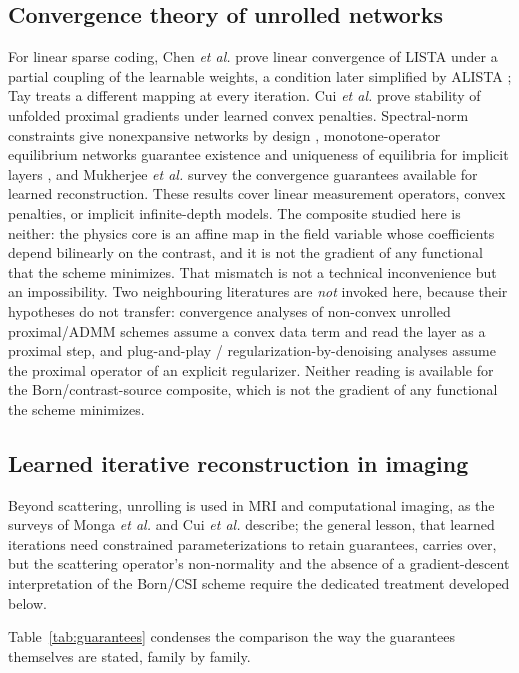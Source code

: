 \documentclass[journal,cmes,article,submit,moreauthors,pdftex]{Definitions/tsp}
\begin{document}
\subsection{Convergence theory of unrolled networks}
For linear sparse coding, Chen \emph{et al.} \cite{listacp} prove linear convergence of LISTA
\cite{lista} under a partial coupling of the learnable weights, a condition later simplified by
ALISTA \cite{alista}; Tay \cite{algomapping} treats a different mapping at every iteration. Cui
\emph{et al.} \cite{cui_reg} prove stability of unfolded proximal gradients under learned convex
penalties. Spectral-norm constraints give nonexpansive networks by design \cite{sherry_nonexp},
monotone-operator equilibrium networks guarantee existence and uniqueness of equilibria for
implicit layers \cite{mondeq}, and Mukherjee \emph{et al.} \cite{mukherjee2023} survey the
convergence guarantees available for learned reconstruction. These results cover
linear measurement operators, convex penalties, or implicit infinite-depth models. The composite
studied here is neither: the physics core is an affine map in the field variable whose coefficients
depend bilinearly on the contrast, and it is not the gradient of any functional that the scheme
minimizes. That mismatch is not a technical inconvenience but an impossibility. Two neighbouring literatures are \emph{not} invoked here, because their
hypotheses do not transfer: convergence analyses of non-convex unrolled proximal/ADMM schemes
assume a convex data term and read the layer as a proximal step, and plug-and-play /
regularization-by-denoising analyses assume the proximal operator of an explicit regularizer.
Neither reading is available for the Born/contrast-source composite, which is not the gradient of
any functional the scheme minimizes.

\subsection{Learned iterative reconstruction in imaging}
Beyond scattering, unrolling is used in MRI and computational imaging, as the surveys of Monga
\emph{et al.} \cite{monga_survey} and Cui \emph{et al.} \cite{cui_reg} describe; the general lesson,
that learned iterations need constrained parameterizations to retain guarantees, carries over, but the scattering operator's
non-normality and the absence of a gradient-descent interpretation of the
Born/CSI scheme require the dedicated treatment developed below.

Table~\ref{tab:guarantees} condenses the comparison the way the guarantees themselves
are stated, family by family.
\end{document}
